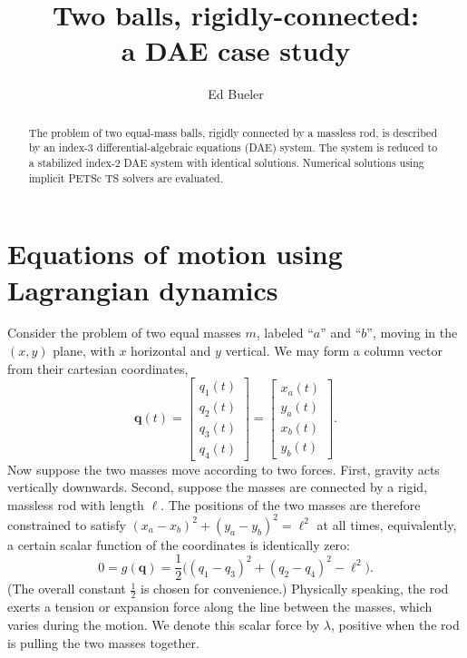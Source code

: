 \documentclass[letterpaper,final,12pt,reqno]{amsart}
\newcommand{\bq}{\mathbf{q}}
\begin{document}
\title[Two balls, rigidly-connected]{Two balls, rigidly-connected: \\ a DAE case study}

\author{Ed Bueler}

\begin{abstract}
The problem of two equal-mass balls, rigidly connected by a massless rod, is described by an index-3 differential-algebraic equations (DAE) system.  The system is reduced to a stabilized index-2 DAE system with identical solutions.  Numerical solutions using implicit PETSc TS solvers are evaluated.
\end{abstract}

\maketitle


\thispagestyle{empty}
\bigskip

\section{Equations of motion using Lagrangian dynamics}

Consider the problem of two equal masses $m$, labeled ``$a$'' and ``$b$'', moving in the $(x,y)$ plane, with $x$ horizontal and $y$ vertical.  We may form a column vector from their cartesian coordinates,
\begin{equation}
\bq(t) = \begin{bmatrix} q_1(t) \\ q_2(t) \\ q_3(t) \\ q_4(t) \end{bmatrix} = \begin{bmatrix} x_a(t) \\ y_a(t) \\ x_b(t) \\ y_b(t) \end{bmatrix}. \label{position}
\end{equation}
Now suppose the two masses move according to two forces.  First, gravity acts vertically downwards.  Second, suppose the masses are connected by a rigid, massless rod with length $\ell$.  The positions of the two masses are therefore constrained to satisfy $(x_a - x_b)^2 + (y_a - y_b)^2 = \ell^2$ at all times, equivalently, a certain scalar function of the coordinates is identically zero:
\begin{equation}
0 = g(\bq) = \frac{1}{2} \Big((q_1 - q_3)^2 + (q_2 - q_4)^2 - \ell^2\Big). \label{constraint}
\end{equation}
(The overall constant $\frac{1}{2}$ is chosen for convenience.)  Physically speaking, the rod exerts a tension or expansion force along the line between the masses, which varies during the motion.  We denote this scalar force by $\lambda$, positive when the rod is pulling the two masses together.
\end{document}
